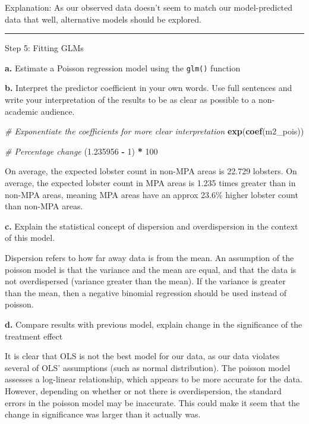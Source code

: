 \documentclass[
]{article}
\newenvironment{Shaded}{\begin{snugshade}}{\end{snugshade}}
\newcommand{\CommentTok}[1]{\textcolor[rgb]{0.56,0.35,0.01}{\textit{#1}}}
\newcommand{\DecValTok}[1]{\textcolor[rgb]{0.00,0.00,0.81}{#1}}
\newcommand{\FloatTok}[1]{\textcolor[rgb]{0.00,0.00,0.81}{#1}}
\newcommand{\FunctionTok}[1]{\textcolor[rgb]{0.13,0.29,0.53}{\textbf{#1}}}
\newcommand{\NormalTok}[1]{#1}
\newcommand{\SpecialCharTok}[1]{\textcolor[rgb]{0.81,0.36,0.00}{\textbf{#1}}}
\begin{document}
Explanation: As our observed data doesn't seem to match our
model-predicted data that well, alternative models should be explored.

\begin{center}\rule{0.5\linewidth}{0.5pt}\end{center}

Step 5: Fitting GLMs

\textbf{a.} Estimate a Poisson regression model using the \texttt{glm()}
function

\textbf{b.} Interpret the predictor coefficient in your own words. Use
full sentences and write your interpretation of the results to be as
clear as possible to a non-academic audience.

\begin{Shaded}
\begin{Highlighting}[]
\CommentTok{\# Exponentiate the coefficients for more clear interpretation}
\FunctionTok{exp}\NormalTok{(}\FunctionTok{coef}\NormalTok{(m2\_pois))}

\CommentTok{\# Percentage change}
\NormalTok{(}\FloatTok{1.235956} \SpecialCharTok{{-}} \DecValTok{1}\NormalTok{) }\SpecialCharTok{*} \DecValTok{100}
\end{Highlighting}
\end{Shaded}

On average, the expected lobster count in non-MPA areas is 22.729
lobsters. On average, the expected lobster count in MPA areas is 1.235
times greater than in non-MPA areas, meaning MPA areas have an approx
23.6\% higher lobster count than non-MPA areas.

\textbf{c.} Explain the statistical concept of dispersion and
overdispersion in the context of this model.

Dispersion refers to how far away data is from the mean. An assumption
of the poisson model is that the variance and the mean are equal, and
that the data is not overdispersed (variance greater than the mean). If
the variance is greater than the mean, then a negative binomial
regression should be used instead of poisson.

\textbf{d.} Compare results with previous model, explain change in the
significance of the treatment effect

It is clear that OLS is not the best model for our data, as our data
violates several of OLS' assumptions (such as normal distribution). The
poisson model assesses a log-linear relationship, which appears to be
more accurate for the data. However, depending on whether or not there
is overdispersion, the standard errors in the poisson model may be
inaccurate. This could make it seem that the change in significance was
larger than it actually was.
\end{document}
